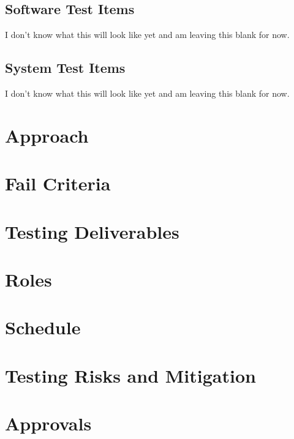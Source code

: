 \documentclass[english,12pt]{article}
\begin{document}
\subsection{Software Test Items}
I don't know what this will look like yet and am leaving this blank for now.
\subsection{System Test Items}
I don't know what this will look like yet and am leaving this blank for now.



\section{Approach}


\section{Fail Criteria}

\section{Testing Deliverables}

\section{Roles}

\section{Schedule}

\section{Testing Risks and Mitigation}

\section{Approvals}
\end{document}
